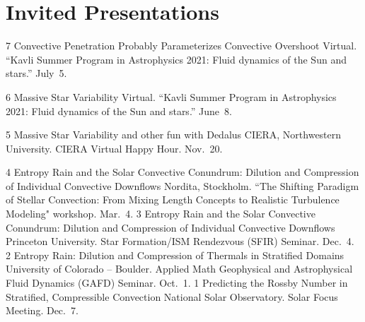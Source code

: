 \section{Invited Presentations}

	  {7}
	  {Convective Penetration Probably Parameterizes Convective Overshoot}
	  {
	  	Virtual. ``Kavli Summer Program in Astrophysics 2021: Fluid dynamics of the Sun and stars.'' July~5.
	  }



\cvpub{}
	  {6}
	  {Massive Star Variability}
	  {
	  	Virtual. ``Kavli Summer Program in Astrophysics 2021: Fluid dynamics of the Sun and stars.'' June~8.
	  }

	  {5}
	  {Massive Star Variability and other fun with Dedalus}
	  {
	  	CIERA, Northwestern University. CIERA Virtual Happy Hour. Nov.~20.
	  }

\cvpub{}
	  {4}
	  {Entropy Rain and the Solar Convective Conundrum: Dilution and Compression of Individual Convective Downflows}
	  {
	  	Nordita, Stockholm. ``The Shifting Paradigm of Stellar Convection: From Mixing Length Concepts to Realistic Turbulence Modeling" workshop. Mar.~4.
	  }
	  {3}
	  {Entropy Rain and the Solar Convective Conundrum: Dilution and Compression of Individual Convective Downflows}
	  {
	  	Princeton University. Star Formation/ISM Rendezvous (SFIR) Seminar. Dec.~4.
	  }
\cvpub{}
	  {2}
	  {Entropy Rain: Dilution and Compression of Thermals in Stratified Domains}
	  {
	  	University of Colorado -- Boulder. Applied Math Geophysical and Astrophysical Fluid Dynamics (GAFD) Seminar. Oct.~1.
	  }
	  {1}
	  {Predicting the Rossby Number in Stratified, Compressible Convection}
	  {
	  	National Solar Observatory. Solar Focus Meeting. Dec.~7.
	  }

